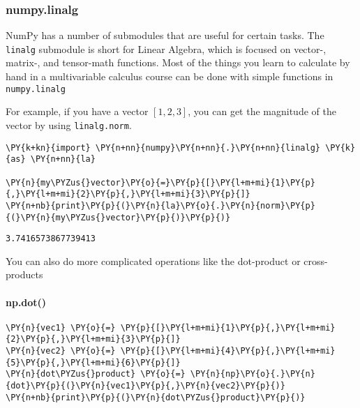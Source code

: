     \hypertarget{numpy.linalg}{%
\subsubsection{numpy.linalg}\label{numpy.linalg}}

NumPy has a number of submodules that are useful for certain tasks. The
\texttt{linalg} submodule is short for Linear Algebra, which is focused
on vector-, matrix-, and tensor-math functions. Most of the things you
learn to calculate by hand in a multivariable calculus course can be
done with simple functions in \texttt{numpy.linalg}

For example, if you have a vector \([1,2,3]\), you can get the magnitude
of the vector by using \texttt{linalg.norm}.

    \begin{tcolorbox}[breakable, size=fbox, boxrule=1pt, pad at break*=1mm,colback=cellbackground, colframe=cellborder]
\begin{Verbatim}[commandchars=\\\{\}]
\PY{k+kn}{import} \PY{n+nn}{numpy}\PY{n+nn}{.}\PY{n+nn}{linalg} \PY{k}{as} \PY{n+nn}{la}

\PY{n}{my\PYZus{}vector}\PY{o}{=}\PY{p}{[}\PY{l+m+mi}{1}\PY{p}{,}\PY{l+m+mi}{2}\PY{p}{,}\PY{l+m+mi}{3}\PY{p}{]}
\PY{n+nb}{print}\PY{p}{(}\PY{n}{la}\PY{o}{.}\PY{n}{norm}\PY{p}{(}\PY{n}{my\PYZus{}vector}\PY{p}{)}\PY{p}{)}
\end{Verbatim}
\end{tcolorbox}

    \begin{Verbatim}[commandchars=\\\{\}]
3.7416573867739413
    \end{Verbatim}

    You can also do more complicated operations like the dot-product or
cross-products

\hypertarget{np.dot}{%
\paragraph{np.dot()}\label{np.dot}}

    \begin{tcolorbox}[breakable, size=fbox, boxrule=1pt, pad at break*=1mm,colback=cellbackground, colframe=cellborder]
\begin{Verbatim}[commandchars=\\\{\}]
\PY{n}{vec1} \PY{o}{=} \PY{p}{[}\PY{l+m+mi}{1}\PY{p}{,}\PY{l+m+mi}{2}\PY{p}{,}\PY{l+m+mi}{3}\PY{p}{]}
\PY{n}{vec2} \PY{o}{=} \PY{p}{[}\PY{l+m+mi}{4}\PY{p}{,}\PY{l+m+mi}{5}\PY{p}{,}\PY{l+m+mi}{6}\PY{p}{]}
\PY{n}{dot\PYZus{}product} \PY{o}{=} \PY{n}{np}\PY{o}{.}\PY{n}{dot}\PY{p}{(}\PY{n}{vec1}\PY{p}{,}\PY{n}{vec2}\PY{p}{)}
\PY{n+nb}{print}\PY{p}{(}\PY{n}{dot\PYZus{}product}\PY{p}{)}
\end{Verbatim}
\end{tcolorbox}

